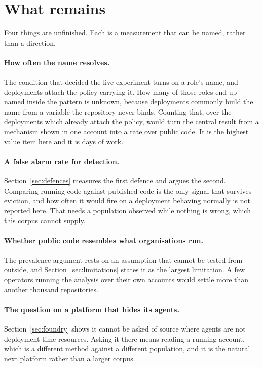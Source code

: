 \section{What remains}
\label{sec:further}

Four things are unfinished. Each is a measurement that can be named, rather
than a direction.

\paragraph{How often the name resolves.}
The condition that decided the live experiment turns on a role's name, and
\nManagedPolicyConfigs deployments attach the policy carrying it. How many of
those roles end up named inside the pattern is unknown, because deployments
commonly build the name from a variable the repository never binds. Counting
that, over the deployments which already attach the policy, would turn the
central result from a mechanism shown in one account into a rate over public
code. It is the highest value item here and it is days of work.

\paragraph{A false alarm rate for detection.}
Section~\ref{sec:defences} measures the first defence and argues the second.
Comparing running code against published code is the only signal that survives
eviction, and how often it would fire on a deployment behaving normally is not
reported here. That needs a population observed while nothing is wrong, which
this corpus cannot supply.

\paragraph{Whether public code resembles what organisations run.}
The prevalence argument rests on an assumption that cannot be tested from
outside, and Section~\ref{sec:limitations} states it as the largest limitation.
A few operators running the analysis over their own accounts would settle more
than another thousand repositories.

\paragraph{The question on a platform that hides its agents.}
Section~\ref{sec:foundry} shows it cannot be asked of source where agents are
not deployment-time resources. Asking it there means reading a running account,
which is a different method against a different population, and it is the
natural next platform rather than a larger corpus.
